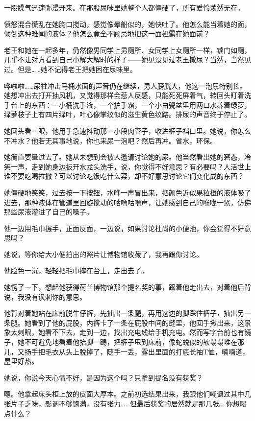 \documentclass[lang=cn,newtx,12pt,scheme=chinese]{elegantbook}
\begin{document}
一股臊气迅速弥漫开来。在那股尿味里她整个人都僵硬了，所有爱怜荡然无存。

愤怒混合慌乱在她胸口搅动，感觉像晕船似的，她快吐了。他怎么能当着她的面，倾倒这种难闻的液体？他怎么竟全不顾忌地把这一面袒露在她面前？

老王和她在一起多年，仍然像男同学上男厕所、女同学上女厕所一样，锁门如厕，几乎不让对方看到自己小解大解时的样子——她见没见过老王撒尿？当然，当然见过。但是……她不记得老王把她困在尿味里。

哗啦啦……尿柱冲击马桶水面的声音仍在继续，男人膀胱大，他这一泡尿特别长。她想冲出去打开抽风机，又觉得那样会惹人反感，只能死死屏着气，转回头盯着洗手台上的东西：一小桶洗手液，一个护手霜，一个小白瓷盆里用两口水养着绿萝，绿萝枝子上有四片绿叶，叶心像掌纹似的滋生黄色纹路。排尿的声音终于停止了。

她回头看一眼，他用手急速抖动那一小段肉管子，收进裤子裆口里。她说，你怎么不冲水？他若无其事地说，你也来尿一泡吧？然后再冲。省水，环保。

她简直要晕过去了。她从未想到会被人邀请讨论她的尿。他当然看出她的窘态，冷笑一声，走到她身边扳开水龙头洗手，说，你觉得不好意思？有必要吗？人活世上谁不要吃喝拉撒？可以讨论吃饭吃什么菜，却不好意思讨论它们变化成的东西？

她僵硬地笑笑，过去按一下按钮，水哗一声冒出来，把颜色近似果粒橙的液体吸了进去，那种液体在管道里回旋搅动的咕噜咕噜声，让她感到自己的喉咙一紧，仿佛那些尿液灌进了自己的嗓子。

他一边用毛巾搌手，正面反面，一边说，如果讨论杜尚的小便池，你会觉得不好意思吗？

她说，等你给大小便拍出的照片让博物馆收藏了，我再跟你讨论。

他脸色一沉，轻轻把毛巾摔在台上，走出去了。

她愣了一下，想起他获得荷兰博物馆那个提名奖的事，跟着他走出去，对着他后背说，我没有讽刺你的意思。

他背对着她站在床前脱牛仔裤，先抽出一条腿，再用这边的脚踩住裤子，抽出另一条腿。她看到了他的屁股，内裤卡了一条在屁股中间的缝里，他回手揪出来，这景象太刺眼，她看不下去，走到一边，找出充电线给手机充电。然而写字台前也有镜子，她不可避免地看着他抬脚一踢，把裤子甩到床前，像蛇蜕似的软塌塌堆在那儿，又扬手把毛衣从头上脱掉了，随手一丢，露出里面的打底长袖T恤，喃喃道，屋里好热。

她说，你说今天心情不好，是因为这个吗？只拿到提名没有获奖？

嗯。他拿起床头柜上放的皮面大厚本。之前初选结果出来，我跟他们嘲讽过其中几张片子乏味，影调不够饱满，没有张力……但最后获奖的居然就是那几张。你想喝点什么？
\end{document}
